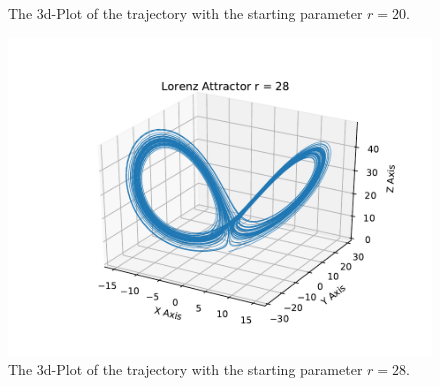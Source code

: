 \begin{itemize}
\begin{itemize}
\begin{figure}
                    \caption{The 3d-Plot of the trajectory with the starting parameter $r=20$.}
                \end{figure}
                \begin{figure}
                    \includegraphics[width=\textwidth]{images/Lorentz_r_28_3d.pdf}
                    \caption{The 3d-Plot of the trajectory with the starting parameter $r=28$.}
                \end{figure}
        \end{itemize}
\end{itemize}                